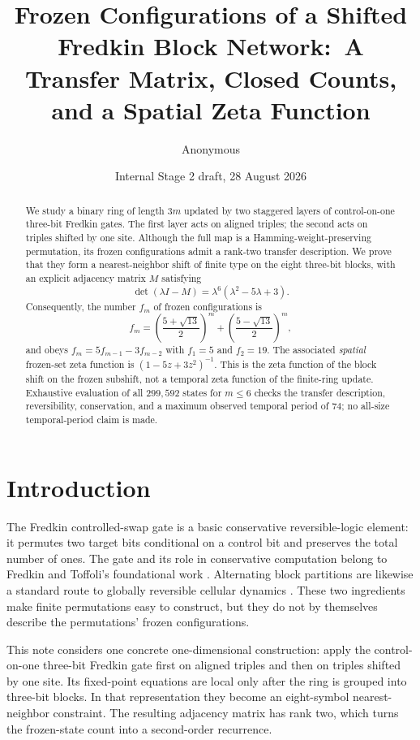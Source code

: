 \documentclass[11pt,a4paper]{amsart}
\title[Shifted Fredkin frozen configurations]{Frozen Configurations of a Shifted Fredkin Block Network:\ A Transfer Matrix, Closed Counts, and a Spatial Zeta Function}
\author{Anonymous}
\date{Internal Stage 2 draft, 28 August 2026}
\theoremstyle{definition}
\theoremstyle{remark}
\begin{document}
\begin{abstract}
We study a binary ring of length $3m$ updated by two staggered layers of
control-on-one three-bit Fredkin gates.  The first layer acts on aligned triples;
the second acts on triples shifted by one site.  Although the full map is a
Hamming-weight-preserving permutation, its frozen configurations admit a
rank-two transfer description.  We prove that they form a nearest-neighbor
shift of finite type on the eight three-bit blocks, with an explicit adjacency
matrix $M$ satisfying
\[
 \det(\lambda I-M)=\lambda^6(\lambda^2-5\lambda+3).
\]
Consequently, the number $f_m$ of frozen configurations is
\[
 f_m=\left(\frac{5+\sqrt{13}}2\right)^m+
     \left(\frac{5-\sqrt{13}}2\right)^m,
\]
and obeys $f_m=5f_{m-1}-3f_{m-2}$ with $f_1=5$ and $f_2=19$.
The associated \emph{spatial} frozen-set zeta function is
$(1-5z+3z^2)^{-1}$.  This is the zeta function of the block shift on the
frozen subshift, not a temporal zeta function of the finite-ring update.
Exhaustive evaluation of all $299{,}592$ states for $m\leq6$ checks the
transfer description, reversibility, conservation, and a maximum observed
temporal period of $74$; no all-size temporal-period claim is made.
\end{abstract}

\maketitle

\section{Introduction}

The Fredkin controlled-swap gate is a basic conservative reversible-logic
element: it permutes two target bits conditional on a control bit and preserves
the total number of ones.  The gate and its role in conservative computation
belong to Fredkin and Toffoli's foundational work \cite{FredkinToffoli1982}.
Alternating block partitions are likewise a standard route to globally
reversible cellular dynamics \cite{ToffoliMargolus1987,Kari1999}.  These two
ingredients make finite permutations easy to construct, but they do not by
themselves describe the permutations' frozen configurations.

This note considers one concrete one-dimensional construction: apply the
control-on-one three-bit Fredkin gate first on aligned triples and then on triples
shifted by one site.  Its fixed-point equations are local only after the ring
is grouped into three-bit blocks.  In that representation they become an
eight-symbol nearest-neighbor constraint.  The resulting adjacency matrix has
rank two, which turns the frozen-state count into a second-order recurrence.
\end{document}
